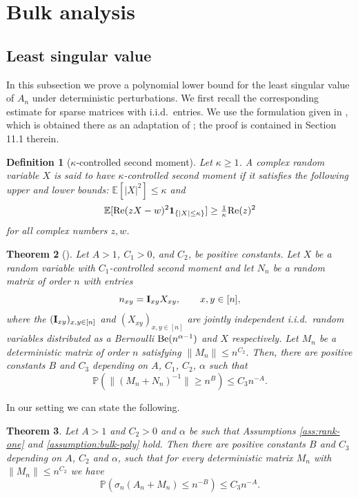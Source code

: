 \documentclass[11pt,oneside]{amsart}
\theoremstyle{plain}
\newtheorem{theorem}{Theorem}[section]
\newtheorem{definition}[theorem]{Definition}
\numberwithin{equation}{section}
\newcommand{\iid}{{i.i.d.~}}
\newcommand{\E}{\mathbb{E}}
\newcommand{\p}{\mathbb{P}}
\newcommand{\one}{\textup{\textbf{1}}}
\begin{document}
\section{Bulk analysis}
\label{sec:bulk}

\subsection{Least singular value}
In this subsection we prove a polynomial lower bound for the least singular value of $A_n$ under deterministic perturbations. We first recall the corresponding estimate for sparse matrices with i.i.d.\ entries. We use the formulation given in \cite[Theorem 2.9]{TV}, which is obtained there as an adaptation of \cite[Theorem 2.5]{TV}; the proof is contained in Section 11.1 therein. 
\begin{definition}[$\kappa$-controlled second moment]
    Let $\kappa \ge 1$. A complex random
variable $X$ is said to have $\kappa$-controlled second moment if it satisfies the following upper and lower bounds: $\E[|X|^2] \le \kappa$ and
\[
\E[{\rm Re}(zX - w)^2\one_{\{|X| \le \kappa\}}] \ge \tfrac{1}{\kappa} {\rm Re}(z)^2
\]
for all complex numbers $z, w$.
\end{definition}
\begin{theorem}[{\cite[Theorem 2.9]{TV}}] \label{thm:least-SV-poly-homogeneous}
        Let $A > 1$, $C_1>0$, and $C_2$, be positive constants.  Let $X$ be a random variable with
$C_1$-controlled second moment and let $N_{n}$ be a random matrix of order $n$ with entries 
\begin{equation}
    n_{xy} = {\bf I}_{xy}  X_{xy}, \qquad x,y \in [n],
\end{equation}
where the $({\bf I}_{xy})_{x,y\in [n]}$ and $(X_{xy})_{x,y\in [n]}$ are jointly
independent \iid random variables distributed as a Bernoulli ${\rm Be}(n^{\alpha-1})$ and $X$ respectively. Let $M_n$ be a deterministic matrix of order $n$ satisfying $\|M_n\|\le n^{C_2}$.  Then, there are positive constants $B$ and $C_3$ depending
on $A$, $C_1$, $C_2$, $\alpha$ such that
\begin{equation}
    \p\left(\|(M_n+N_{n})^{-1}\| \ge n^{B}\right) \le C_3 n^{-A}.
\end{equation}
\end{theorem}
In our setting we can state the following.
\begin{theorem} \label{thm:least-SV-poly-inhomogeneous}
        Let $A > 1$ and $C_2>0$ and $\alpha$ be such that Assumptions \ref{ass:rank-one} and \ref{assumption:bulk-poly} hold. Then there are positive constants $B$ and $C_3$ depending on $A$, $C_2$ and $\alpha$, such that for every deterministic matrix $M_n$ with $\|M_n\|\le n^{C_2}$ we have
\begin{equation} \label{eq:thesis-sv}
    \p\left(\sigma_{n}(A_n+M_n) \le n^{-B}\right) \le C_3 n^{-A}.
\end{equation}
\end{theorem}
\end{document}
